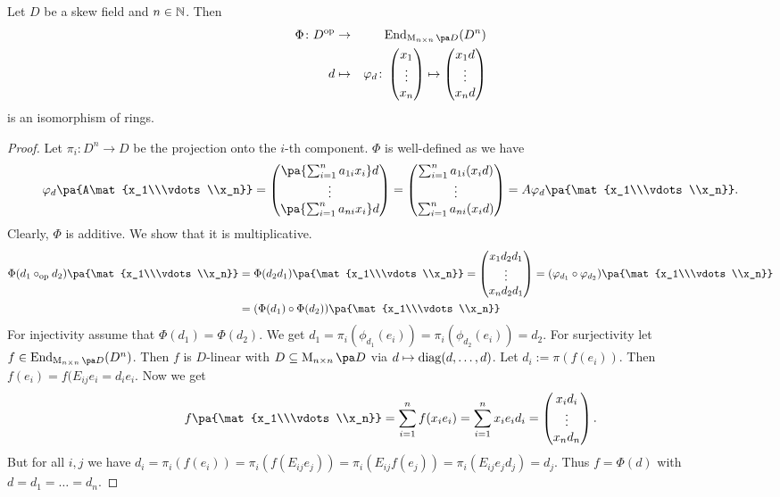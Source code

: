 \documentclass[12pt,a4paper]{scrartcl}
\theoremstyle{cplain}
\theoremstyle{cplain}
\theoremstyle{cplain}
\theoremstyle{definition}
\begin{document}
\begin{otherlanguage}{english}
\begin{description}
\end{description}


\begin{lem} \label{lem:V.25} %
  Let $D$ be a skew field and $n\in \mathbb N$. Then
  \begin{eqnarray*}
    \Phi\colon D^{\op} &\to& \End_{\Mat nD} (D^{n}) \\
    d &\mapsto& \phi_d \colon \mat{x_1\\\vdots\\x_n} \mapsto \mat{x_1d\\\vdots\\x_nd}
  \end{eqnarray*}
  is an isomorphism of rings.
\end{lem}
\begin{proof}
  Let $\pi_i\colon D^n\to D$ be the projection onto the $i$-th component. $\Phi$ is well-defined as we have \[ \phi_d\pa{A\mat{x_1\\\vdots\\x_n}} = \mat{\pa{\sum_{i=1}^na_{1i}x_i}d\\\vdots\\\pa{\sum_{i=1}^na_{ni}x_i}d} = \mat{\sum_{i=1}^na_{1i}(x_id)\\\vdots\\\sum_{i=1}^na_{ni}(x_id)} = A\phi_d\pa{\mat{x_1\\\vdots\\x_n}}. \]
  Clearly, $\Phi$ is additive. We show that it is multiplicative.
  \begin{align*}
    \Phi(d_1\circ_{\op}d_2)\pa{\mat{x_1\\\vdots\\x_n}} &= \Phi(d_2d_1)\pa{\mat{x_1\\\vdots\\x_n}} = \mat{x_1d_2d_1\\\vdots\\x_nd_2d_1} = (\phi_{d_1}\circ \phi_{d_2})\pa{\mat{x_1\\\vdots\\x_n}}\\ &= (\Phi(d_1)\circ\Phi(d_2))\pa{\mat{x_1\\\vdots\\x_n}}
  \end{align*}
  For injectivity assume that $\Phi(d_1) = \Phi(d_2)$. We get $d_1 = \pi_i(\phi_{d_1}(e_i)) = \pi_i(\phi_{d_2}(e_i)) = d_2$.
  For surjectivity let $f\in \End_{\Mat nD}(D^n)$. Then $f$ is $D$-linear with $D \subseteq \Mat nD$ via $d\mapsto \operatorname{diag}(d,\ldots,d)$. Let $d_i := \pi(f(e_i))$. Then $f(e_i) = f(E_{ij}e_i = d_ie_i$. Now we get \[f\pa{\mat{x_1\\\vdots\\x_n}} = \sum_{i=1}^nf(x_ie_i) = \sum_{i=1}^nx_ie_id_i = \mat{x_id_i\\\vdots\\x_nd_n}.\] But for all $i,j$ we have $d_i = \pi_i(f(e_i)) = \pi_i(f(E_{ij}e_j)) = \pi_i(E_{ij}f(e_j)) = \pi_i(E_{ij}e_jd_j) = d_j$. Thus $f = \Phi(d)$ with $d = d_1 = \ldots = d_n$.
\end{proof}


\end{otherlanguage}
\end{document}

